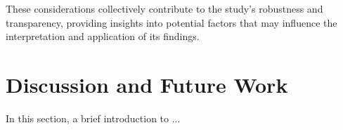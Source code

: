 These considerations collectively contribute to the study's robustness and transparency, providing insights into potential factors that may influence the interpretation and application of its findings.

\section{Discussion and Future Work}
\label{sec:discussion}
\vspace{0.2 cm}

In this section, a brief introduction to ... 




